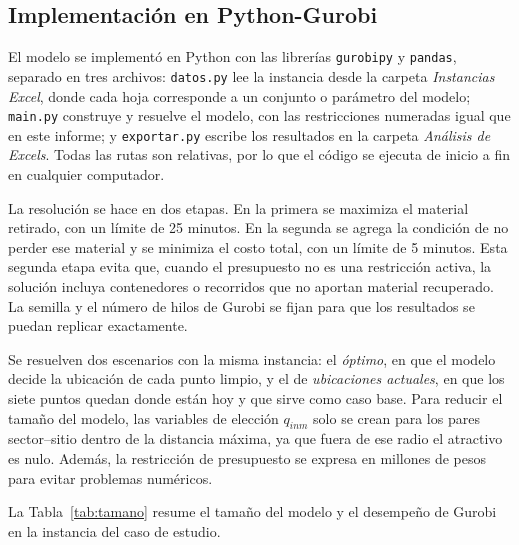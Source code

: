 
\subsection{Implementación en Python-Gurobi}

El modelo se implementó en Python con las librerías \texttt{gurobipy} y \texttt{pandas}, separado en tres archivos: \texttt{datos.py} lee la instancia desde la carpeta \textit{Instancias Excel}, donde cada hoja corresponde a un conjunto o parámetro del modelo; \texttt{main.py} construye y resuelve el modelo, con las restricciones numeradas igual que en este informe; y \texttt{exportar.py} escribe los resultados en la carpeta \textit{Análisis de Excels}. Todas las rutas son relativas, por lo que el código se ejecuta de inicio a fin en cualquier computador.

La resolución se hace en dos etapas. En la primera se maximiza el material retirado, con un límite de 25 minutos. En la segunda se agrega la condición de no perder ese material y se minimiza el costo total, con un límite de 5 minutos. Esta segunda etapa evita que, cuando el presupuesto no es una restricción activa, la solución incluya contenedores o recorridos que no aportan material recuperado. La semilla y el número de hilos de Gurobi se fijan para que los resultados se puedan replicar exactamente.

Se resuelven dos escenarios con la misma instancia: el \textit{óptimo}, en que el modelo decide la ubicación de cada punto limpio, y el de \textit{ubicaciones actuales}, en que los siete puntos quedan donde están hoy y que sirve como caso base. Para reducir el tamaño del modelo, las variables de elección $q_{inm}$ solo se crean para los pares sector--sitio dentro de la distancia máxima, ya que fuera de ese radio el atractivo es nulo. Además, la restricción de presupuesto se expresa en millones de pesos para evitar problemas numéricos.

La Tabla~\ref{tab:tamano} resume el tamaño del modelo y el desempeño de Gurobi en la instancia del caso de estudio.


